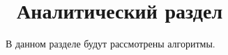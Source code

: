 \chapter{ Аналитический раздел}
\label{cha:analytical}
    В данном разделе будут рассмотрены 
    алгоритмы.

    

\newpage